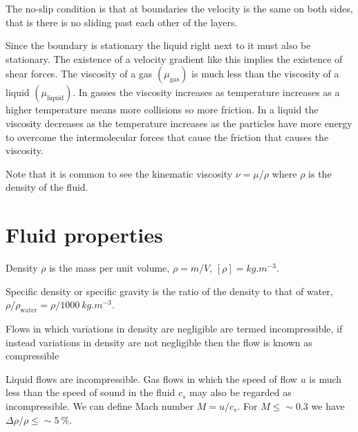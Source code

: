 \documentclass{article}
\begin{document}
    The no-slip condition is that at boundaries the velocity is the same on both sides, that is there is no sliding past each other of the layers.
    \begin{center}
    \end{center}
    Since the boundary is stationary the liquid right next to it must also be stationary. The existence of a velocity gradient like this implies the existence of shear forces.
    The viscosity of a gas \((\mu_\text{gas})\) is much less than the viscosity of a liquid \((\mu_\text{liquid})\). In gasses the viscosity increases as temperature increases as a higher temperature means more collisions so more friction. In a liquid the viscosity decreases as the temperature increases as the particles have more energy to overcome the intermolecular forces that cause the friction that causes the viscosity.
    
    Note that it is common to see the kinematic viscosity \(\nu =\mu/\rho\) where \(\rho\) is the density of the fluid.
    
    \section{Fluid properties}
    Density \(\rho\) is the mass per unit volume, \(\rho = m/V\), \([\rho]=\si{kg.m^{-3}}\).
    
    Specific density or specific gravity is the ratio of the density to that of water, \(\rho/\rho_{\text{water}}=\rho/\SI{1000}{kg.m^{-3}}\).
    
    Flows in which variations in density are negligible are termed incompressible, 
    if instead variations in density are not negligible then the flow is known as compressible
    
    Liquid flows are incompressible. 
    Gas flows in which the speed of flow \(u\) is much less than the speed of sound in the fluid \(c_s\) may also be regarded as incompressible.
    We can define Mach number \(M = u/c_s\). For \(M\le\sim0.3\) we have \(\Delta\rho/\rho\le\sim\SI{5}{\%}\).
    
\end{document}
